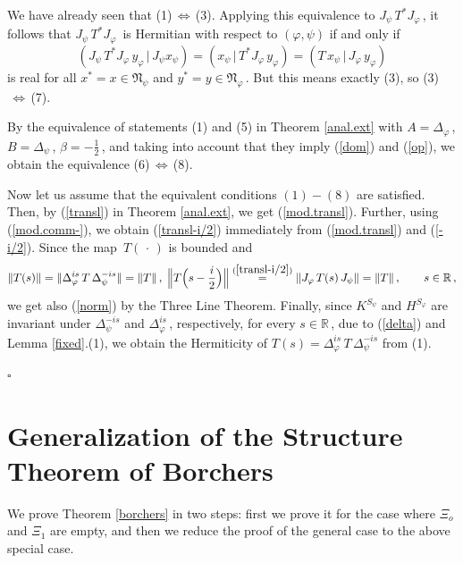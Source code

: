 \documentclass[reqno]{amsart}
\theoremstyle{definition}
\theoremstyle{remark}
\numberwithin{equation}{section}
\theoremstyle{plain}
\begin{document}
We have already seen that (1)$\,\Leftrightarrow\,$(3). Applying this
equivalence to $J_\psi\, T^* J_\varphi\,$, it follows that
$J_\psi\, T^* J_\varphi\,$ is Hermitian with respect to
$(\varphi ,\psi )$ if and only if
\begin{equation*}
(J_\psi\, T^* J_\varphi\, y_\varphi\, |\, J_\psi x_\psi )=
(x_\psi\, |\, T^* J_\varphi\, y_\varphi )=(T\, x_\psi\, |\,
J_\varphi\, y_\varphi )
\end{equation*}
is real for all $x^*=x\in\mathfrak N_\psi$ and $y^*=y\in
\mathfrak N_\varphi\,$. But this means exactly (3), so (3)$\,
\Leftrightarrow\,$(7).

By the equivalence of statements (1) and (5) in Theorem
\ref{anal.ext} with $A=\Delta_\varphi\,$, $B=\Delta_\psi\,$,
$\beta =-\frac 12\,$, and taking into account that they imply
(\ref{dom}) and (\ref{op}), we obtain the equivalence (6)$\,
\Leftrightarrow\,$(8).

Now let us assume that the equivalent conditions $(1) - (8)$ are
satisfied. Then, by (\ref{transl}) in Theorem \ref{anal.ext}, we
get (\ref{mod.transl}). Further, using (\ref{mod.comm-}), we
obtain (\ref{transl-i/2}) immediately from (\ref{mod.transl})
and (\ref{-i/2}). Since the map $\, T(\,\cdot\, )$ is bounded and
\begin{equation*}
\| T(s)\| =\|\Delta_\varphi^{is}\, T\,\Delta_\psi^{-is}\| =\| T\|\, ,
\; \Big\| T\Big( s-\frac i2 \Big)\Big\|
\overset{(\ref{transl-i/2})}{=}
\| J_\varphi\, T(s)\, J_\psi\| =\| T\|\, ,\qquad s\in\mathbb R\, ,
\end{equation*}
we get also (\ref{norm}) by the Three Line Theorem. Finally,
since $K^{S_\psi}$ and $H^{S_\varphi}$ are invariant under
$\Delta_\psi^{-is}$ and $\Delta_\varphi^{is}\,$, respectively,
for every $s\in\mathbb R\,$, due to (\ref{delta}) and Lemma
\ref{fixed}.(1), we obtain the Hermiticity of $T(s)=
\Delta_\varphi^{is}\, T\,\Delta_\psi^{-is}$ from (1).

\hfill $\square\quad$

\bigskip
\section{Generalization of the Structure Theorem of Borchers}
\bigskip

We prove Theorem \ref{borchers} in two steps: first we prove it
for the case where $\Xi_o$ and $\Xi_1$ are empty, and then we reduce
the proof of the general case to the above special case.
\end{document}
